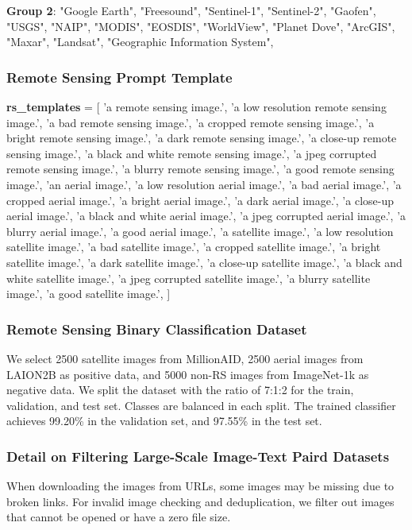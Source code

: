 \documentclass[journal]{IEEEtran}
\begin{document}
\textbf{Group 2}:    "Google Earth", "Freesound", "Sentinel-1", "Sentinel-2", "Gaofen", "USGS", "NAIP", "MODIS", "EOSDIS", "WorldView", "Planet Dove", "ArcGIS", "Maxar", "Landsat", "Geographic Information System",

\subsubsection{Remote Sensing Prompt Template} \label{rs_pt}

\textbf{rs\_templates} = [
        'a remote sensing image.',
        'a low resolution remote sensing image.',
        'a bad remote sensing image.',
        'a cropped remote sensing image.',
        'a bright remote sensing image.',
        'a dark remote sensing image.',
        'a close-up remote sensing image.',
        'a black and white remote sensing image.',
        'a jpeg corrupted remote sensing image.',
        'a blurry remote sensing image.',
        'a good remote sensing image.',
        'an aerial image.',
        'a low resolution aerial image.',
        'a bad aerial image.',
        'a cropped aerial image.',
        'a bright aerial image.',
        'a dark aerial image.',
        'a close-up aerial image.',
        'a black and white aerial image.',
        'a jpeg corrupted aerial image.',
        'a blurry aerial image.',
        'a good aerial image.',
        'a satellite image.',
        'a low resolution satellite image.',
        'a bad satellite image.',
        'a cropped satellite image.',
        'a bright satellite image.',
        'a dark satellite image.',
        'a close-up satellite image.',
        'a black and white satellite image.',
        'a jpeg corrupted satellite image.',
        'a blurry satellite image.',
        'a good satellite image.',
    ]

\subsubsection{Remote Sensing Binary Classification Dataset} \label{bi_cls_dataset} 
We select 2500 satellite images from MillionAID, 2500 aerial images from LAION2B as positive data, and 5000 non-RS images from ImageNet-1k as negative data. We split the dataset with the ratio of 7:1:2 for the train, validation, and test set. Classes are balanced in each split. The trained classifier achieves 99.20\% in the validation set, and 97.55\% in the test set.



\subsubsection{Detail on Filtering Large-Scale Image-Text Paird Datasets}
\label{appendix:detail_filter_pub}
When downloading the images from URLs, some images may be missing due to broken links. For invalid image checking and deduplication, we filter out images that cannot be opened or have a zero file size. 
\end{document}
